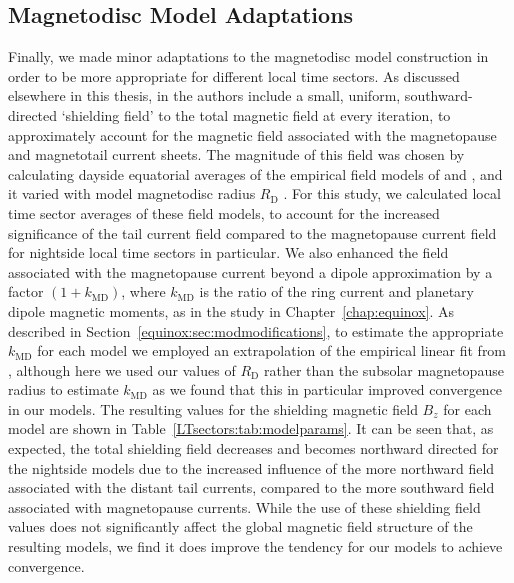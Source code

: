 \subsection{Magnetodisc Model Adaptations}\label{LTsectors:sec:adaptations}
Finally, we made minor adaptations to the magnetodisc model construction in order to be more appropriate for different local time sectors. As discussed elsewhere in this thesis, in \citet{achilleos2010a} the authors include a small, uniform, southward-directed `shielding field' to the total magnetic field at every iteration, to approximately account for the magnetic field associated with the magnetopause and magnetotail current sheets. The magnitude of this field was chosen by calculating dayside equatorial averages of the empirical field models of \citet{alexeev2005} and \citet{alexeev2006}, and it varied with model magnetodisc radius $R_\mathrm{D}$ \citep[see][Figure 6]{achilleos2010a}. For this study, we calculated local time sector averages of these field models, to account for the increased significance of the tail current field compared to the magnetopause current field for nightside local time sectors in particular. We also enhanced the field associated with the magnetopause current beyond a dipole approximation by a factor $(1+k_\mathrm{MD})$, where $k_\mathrm{MD}$ is the ratio of the ring current and planetary dipole magnetic moments, as in the study in Chapter~\ref{chap:equinox}. As described in Section~\ref{equinox:sec:modmodifications}, to estimate the appropriate $k_\mathrm{MD}$ for each model we employed an extrapolation of the empirical linear fit from \citet{bunce2007}, although here we used our values of $R_\mathrm{D}$ rather than the subsolar magnetopause radius to estimate $k_\mathrm{MD}$ as we found that this in particular improved convergence in our models. The resulting values for the shielding magnetic field $B_z$ for each model are shown in Table~\ref{LTsectors:tab:modelparams}. It can be seen that, as expected, the total shielding field decreases and becomes northward directed for the nightside models due to the increased influence of the more northward field associated with the distant tail currents, compared to the more southward field associated with magnetopause currents. While the use of these shielding field values does not significantly affect the global magnetic field structure of the resulting models, we find it does improve the tendency for our models to achieve convergence.

